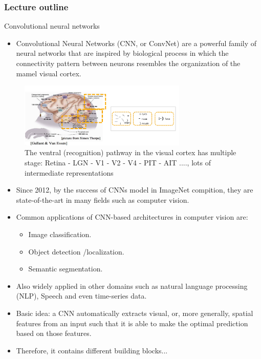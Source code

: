 








\begin{frame}
\frametitle{Lecture outline}
\tableofcontents
\end{frame}

\begin{vbframe}{Convolutional neural networks}
  \begin{itemize}
    \item Convolutional Neural Networks (CNN, or ConvNet) are a powerful family of neural networks that are inspired by biological process in which the connectivity pattern between neurons resembles the organization of the mamel visual cortex.
    \end{itemize}
 \begin{figure}
    \centering
    \includegraphics[width=8cm]{plots/cortex.png}
    \caption{The ventral (recognition) pathway in the visual cortex has multiple stage: Retina - LGN - V1 - V2 - V4 - PIT - AIT ...., lots of intermediate representations}
  \end{figure}
  
    \begin{itemize}
    \item Since 2012, by the success of CNNs model in ImageNet compition, they are state-of-the-art in many fields such as computer vision.
    \item Common applications of CNN-based architectures in computer vision are:
    \begin{itemize}
      \item Image classification.
      \item Object detection /localization.
      \item Semantic segmentation.
    \end{itemize}
    \item Also widely applied in other domains such as natural language processing (NLP), Speech and even time-series data.
    \item Basic idea: a CNN automatically extracts visual, or, more generally, spatial features from an input such that it is able to make the optimal prediction based on those features.
    \item Therefore, it contains different building blocks...
  \end{itemize}
\end{vbframe}



